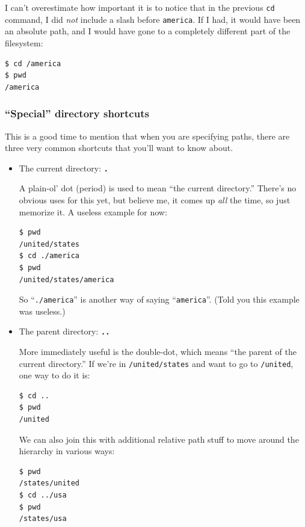 \begin{enumerate}
I can't overestimate how important it is to notice that in the previous
\texttt{cd} command, I did \textit{not} include a slash before
\texttt{america}. If I had, it would have been an absolute path, and I would
have gone to a completely different part of the filesystem:

\begin{verbatim}
$ cd /america
$ pwd
/america
\end{verbatim}

\subsubsection{``Special'' directory shortcuts}

This is a good time to mention that when you are specifying paths, there are
three very common shortcuts that you'll want to know about.


\begin{itemize}
\itemsep1em
\item The current directory: \texttt{\textbf{.}}

A plain-ol' dot (period) is used to mean ``the current directory.'' There's no
obvious uses for this yet, but believe me, it comes up \textit{all} the time,
so just memorize it. A useless example for now:

\begin{verbatim}
$ pwd
/united/states
$ cd ./america
$ pwd
/united/states/america
\end{verbatim}

So ``\texttt{./america}'' is another way of saying ``\texttt{america}''. (Told
you this example was useless.)

\item The parent directory: \texttt{\textbf{..}}

More immediately useful is the double-dot, which means ``the parent of the
current directory.'' If we're in \texttt{/united/states} and want to go to
\texttt{/united}, one way to do it is:

\begin{verbatim}
$ cd ..
$ pwd
/united
\end{verbatim}

We can also join this with additional relative path stuff to move around the
hierarchy in various ways:

\begin{verbatim}
$ pwd
/states/united
$ cd ../usa
$ pwd
/states/usa
\end{verbatim}


\end{itemize}
\end{enumerate}
